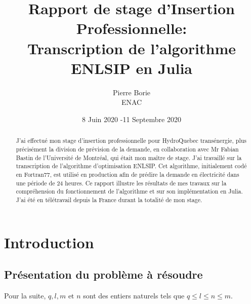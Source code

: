 \documentclass[a4paper,11pt]{article}
\numberwithin{equation}{section}
\begin{document}
\title{Rapport de stage d'Insertion Professionnelle: \\ Transcription de l'algorithme ENLSIP en Julia}
\author{Pierre Borie \\ ENAC}

\date{8 Juin 2020 -11 Septembre 2020}
\maketitle



	
\begin{abstract}
J'ai effectué mon stage d'insertion professionnelle pour HydroQuebec transénergie, plus précisément la division de prévision de la demande, en collaboration avec Mr Fabian Bastin de l'Université de Montréal, qui était mon maître de stage. J'ai travaillé sur la transcription de l'algorithme d'optimisation ENLSIP. Cet algorithme, initialement codé en Fortran77, est utilisé en production afin de prédire la demande en électricité dans une période de 24 heures. Ce rapport illustre les résultats de mes travaux sur la compréhension du fonctionnement de l'algorithme et sur son implémentation en Julia. J'ai été en télétravail depuis la France durant la totalité de mon stage. 
\end{abstract}

\tableofcontents

\section{Introduction} \label{intro}
\subsection{Présentation du problème à résoudre} \label{presentation}


Pour la suite, $q,l,m\text{ et }n$ sont des entiers naturels tels que $q \leq l \leq n \leq m$. 
\end{document}
